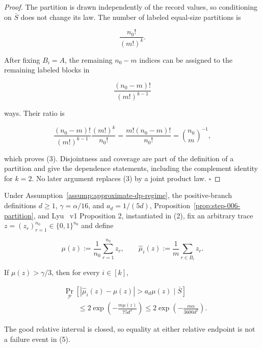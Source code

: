 \begin{proof}
The partition is drawn independently of the record values, so
conditioning on \(\bar S\) does not change its law.  The number of labeled
equal-size partitions is

\[
 \frac{n_0!}{(m!)^k}.
\]

After fixing \(B_i=A\), the remaining \(n_0-m\) indices can be assigned to
the remaining labeled blocks in

\[
 \frac{(n_0-m)!}{(m!)^{k-1}}
\]

ways.  Their ratio is

\[
 \frac{(n_0-m)!}{(m!)^{k-1}}
 \frac{(m!)^k}{n_0!}
 =\frac{m!(n_0-m)!}{n_0!}
 =\binom{n_0}{m}^{-1},
\]

which proves (3).  Disjointness and coverage are part of the definition of
a partition and give the dependence statements, including the complement
identity for \(k=2\).  No later argument replaces (3) by a joint product
law. \(\square\)


\end{proof}

\begin{lemma}\label{lem:step-006-high-tail}
Under Assumption~\ref{assump:approximate-dp-regime}, the positive-branch
definitions \(d\geq1\), \(\gamma=\alpha/16\), and \(a_d=1/(5d)\),
Proposition~\ref{prop:step-006-partition}, and Lyu~\citep{lyu2025} v1
  Proposition 2, instantiated in (2), fix an arbitrary trace
\(z=(z_r)_{r=1}^{n_0}\in\{0,1\}^{n_0}\) and define

\[
 \mu(z):=\frac1{n_0}\sum_{r=1}^{n_0}z_r,
 \qquad
 \widehat\mu_i(z):=\frac1m\sum_{r\in B_i}z_r.
\tag{4}
\]

If \(\mu(z)>\gamma/3\), then for every \(i\in[k]\),

\[
\begin{aligned}
 &\Pr_{\mathcal P}
 \left[|\widehat\mu_i(z)-\mu(z)|>a_d\mu(z)\mid\bar S\right]\\
 &\qquad\leq
 2\exp\!\left(-\frac{m\mu(z)}{75d^2}\right)
 \leq
 2\exp\!\left(-\frac{m\alpha}{3600d^2}\right).
\end{aligned}
\tag{5}
\]

The good relative interval is closed, so equality at either relative
endpoint is not a failure event in (5).


\end{lemma}

